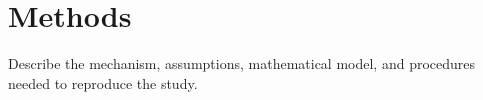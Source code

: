 \section{Methods}\label{sec:methods}
Describe the mechanism, assumptions, mathematical model, and procedures
needed to reproduce the study.
